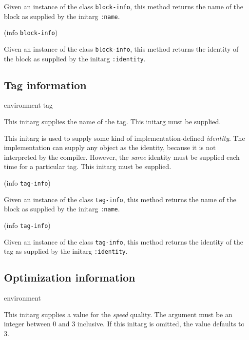 Given an instance of the class \texttt{block-info}, this method
returns the name of the block as supplied by the initarg
\texttt{:name}.

 {(info {\tt block-info})}

Given an instance of the class \texttt{block-info}, this method
returns the identity of the block as supplied by the initarg
\texttt{:identity}.

\subsection{Tag information}

 {environment tag}



This initarg supplies the name of the tag.  This initarg must be
supplied.


This initarg is used to supply some kind of implementation-defined 
\emph{identity}.  The implementation can supply any object as the
identity, because it is not interpreted by the compiler.  However, the
\emph{same} identity must be supplied each time for a particular
tag.  This initarg must be supplied. 

 {(info {\tt tag-info})}

Given an instance of the class \texttt{tag-info}, this method
returns the name of the block as supplied by the initarg
\texttt{:name}.

 {(info {\tt tag-info})}

Given an instance of the class \texttt{tag-info}, this method
returns the identity of the tag as supplied by the initarg
\texttt{:identity}.

\subsection{Optimization information}

 {environment}



This initarg supplies a value for the \emph{speed} quality.  The
argument must be an integer between $0$ and $3$ inclusive.  If this
initarg is omitted, the value defaults to $3$.

